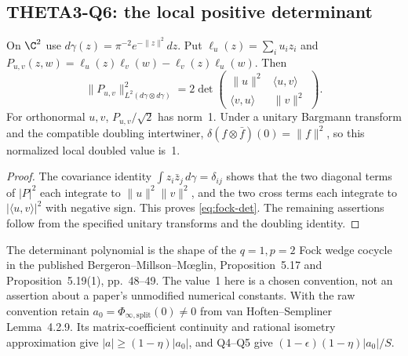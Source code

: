 \subsection{THETA3-Q6: the local positive determinant}\label{Q6}
On $\C^2$ use $d\gamma(z)=\pi^{-2}e^{-\|z\|^2}dz$. Put
$\ell_u(z)=\sum_i u_i z_i$ and
$P_{u,v}(z,w)=\ell_u(z)\ell_v(w)-\ell_v(z)\ell_u(w)$.
Then
\begin{equation}\label{eq:fock-det}
 \|P_{u,v}\|^2_{L^2(d\gamma\otimes d\gamma)}
 =2\det\begin{pmatrix}\|u\|^2&\langle u,v\rangle\\
 \langle v,u\rangle&\|v\|^2\end{pmatrix}.
\end{equation}
For orthonormal $u,v$, $P_{u,v}/\sqrt2$ has norm~1. Under a unitary Bargmann transform and the compatible doubling intertwiner,
$\delta(f\otimes\bar f)(0)=\|f\|^2$, so this normalized local doubled value is~1.
\begin{proof}
The covariance identity $\int z_i\bar z_j\,d\gamma=\delta_{ij}$ shows that the two diagonal terms of $|P|^2$ each integrate to $\|u\|^2\|v\|^2$, and the two cross terms each integrate to $|\langle u,v\rangle|^2$ with negative sign. This proves \eqref{eq:fock-det}. The remaining assertions follow from the specified unitary transforms and the doubling identity.
\end{proof}
The determinant polynomial is the shape of the $q=1,p=2$ Fock wedge cocycle in the published Bergeron--Millson--M\oe glin, Proposition~5.17 and Proposition~5.19(1), pp.~48--49. The value~1 here is a chosen convention, not an assertion about a paper's unmodified numerical constants. With the raw convention retain
$a_0=\Phi_{\infty,\mathrm{split}}(0)\ne0$ from van Hoften--Sempliner Lemma~4.2.9. Its matrix-coefficient continuity and rational isometry approximation give
$|a|\geq(1-\eta)|a_0|$, and Q4--Q5 give
$(1-\epsilon)(1-\eta)|a_0|/S$.

